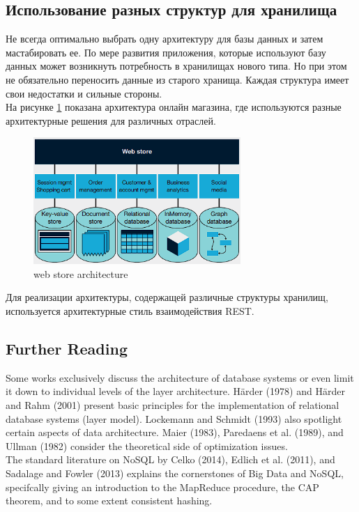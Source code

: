 \documentclass{article}
\begin{document}
\subsection{Использование разных структур для хранилища}
Не всегда оптимально выбрать одну архитектуру для базы данных и затем мастабировать ее. По мере развития приложения, которые используют базу данных может возникнуть 
потребность в хранилищах нового типа. Но при этом не обязательно переносить данные из старого хранища. Каждая структура имеет свои недостатки и сильные стороны.\\
На рисунке \ref{img11} показана архитектура онлайн магазина, где используются разные архитектурные решения для различных отраслей. 
\begin{figure}[ht]
    \centering
    \includegraphics[width=0.7\textwidth]{images/web_store.png}
    \caption{web store architecture}
    \label{img11}
\end{figure}
Для реализации архитектуры, содержащей различные структуры хранилищ, используется архитектурные стиль взаимодействия REST.

\subsection{Further Reading}
Some works exclusively discuss the architecture of database systems or even limit it 
down to individual levels of the layer architecture. Härder (1978) and Härder and Rahm 
(2001) present basic principles for the implementation of relational database systems 
(layer model). Lockemann and Schmidt (1993) also spotlight certain aspects of data 
architecture. Maier (1983), Paredaens et al. (1989), and Ullman (1982) consider the theoretical side of optimization issues.
\\The standard literature on NoSQL by Celko (2014), Edlich et al. (2011), and Sadalage 
and Fowler (2013) explains the cornerstones of Big Data and NoSQL, specifcally giving 
an introduction to the MapReduce procedure, the CAP theorem, and to some extent consistent hashing.
\end{document}
